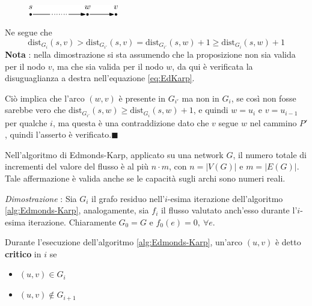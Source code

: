 \documentclass[10pt, letterpaper]{report}
\begin{document}
\begin{figure}[h!]
    \centering 
    \includegraphics[width=0.35\textwidth ]{images/Edmond-Karp-Proof.eps}
\end{figure}
Ne segue che  
\begin{equation}\label{eq:EdKarp}
\text{dist}_{G_i}(s,v)>\text{dist}_{G_{i'}}(s,v)=\text{dist}_{G_{i'}}(s,w)+1\ge  \text{dist}_{G_i}(s,w)+1\end{equation}
\textbf{Nota } : 
nella dimostrazione si sta assumendo che la proposizione non sia valida per il nodo $v$, ma che sia valida per il nodo $w$, da qui è verificata la disuguaglianza a destra nell'equazione \ref{eq:EdKarp}.

Ciò implica che l'arco $(w,v)$ è presente in $G_{i'}$ ma non in $G_i$, se così non fosse sarebbe vero che $\text{dist}_{G_{i'}}(s,w)\ge  \text{dist}_{G_i}(s,w)+1$, e quindi  $w=u_i$ e $v=u_{i-1}$ per qualche $i$, ma questa è una contraddizione dato che $v$ segue $w$ nel cammino $P'$, quindi l'asserto è verificato.\hfill$\blacksquare$
\begin{teorema}\label{nm-aumenti}
Nell'algoritmo di Edmonds-Karp, applicato su una network $G$, il numero totale di incrementi del valore del flusso è al più $n\cdot m$, con $n=|V(G)|$ e $m=|E(G)|$. Tale affermazione è valida anche se le capacità sugli archi sono numeri reali.
\end{teorema}
\textit{Dimostrazione} : Sia $G_i$ il grafo residuo nell'$i$-esima iterazione dell'algoritmo \ref{alg:Edmonds-Karp}, analogamente, sia $f_i$ il flusso valutato anch'esso durante l'$i$-esima iterazione. Chiaramente $G_0=G$ e $f_0(e)=0, \ \forall e$. 
\begin{definizione}
    Durante l'esecuzione dell'algoritmo \ref{alg:Edmonds-Karp}, un'arco $(u,v)$ è detto \textbf{critico} in $i$ se \begin{itemize}
        \item $(u,v)\in G_i$
        \item $(u,v)\notin G_{i+1}$
    \end{itemize}
\end{definizione}
\end{document}
